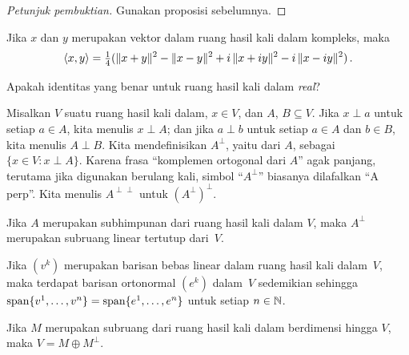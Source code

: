 \begin{proof}[\emph{Petunjuk pembuktian}] Gunakan proposisi sebelumnya. \ns
\end{proof}

\begin{prop}\label{0001507} Jika $x$ dan $y$ merupakan vektor
dalam ruang hasil kali dalam kompleks, maka
 \[ \langle x,y \rangle = \tfrac14 (\lVert x + y\rVert^2 - \lVert x - y\rVert^2
                       + i\,\lVert x + iy\rVert^2 - i\,\lVert x - iy\rVert^2)\,. \]
\end{prop}

Apakah identitas yang benar untuk ruang hasil kali dalam \emph{real}?

\begin{notn}\label{0001511} Misalkan $V$ suatu ruang hasil kali dalam, $x \in V$, dan $A$,
$B \subseteq V$. Jika $x \perp a$ untuk setiap $a \in A$, kita menulis $x \perp A$; dan jika $a
\perp b$ untuk setiap $a \in A$ dan $b \in B$, kita menulis $A \perp B$.
Kita mendefinisikan $A^\perp$, yaitu
 dari $A$, sebagai $\{x \in V\colon x \perp A\}$. Karena frasa ``komplemen ortogonal dari $A$''
agak panjang, terutama jika digunakan berulang kali, simbol ``$A^\perp$'' biasanya dilafalkan ``A perp''.
Kita menulis $A^{\perp\perp}$ untuk $\left(A^\perp\right)^\perp$.
\end{notn}

\begin{prop}\label{0001512} Jika $A$ merupakan subhimpunan dari ruang hasil kali dalam $V$, maka
$A^\perp$ merupakan subruang linear tertutup dari~$V$.
\end{prop}

\begin{prop} Jika $(v^k)$ merupakan barisan bebas linear dalam
ruang hasil kali dalam~$V$, maka terdapat barisan ortonormal $(e^k)$ dalam~$V$ sedemikian sehingga
$\operatorname{span}\{v^1, \dots, v^n\} = \operatorname{span}\{e^1, \dots, e^n\}$ untuk setiap $n \in \mathbb{N}$.
\end{prop}

\begin{cor}\label{0001514} Jika $M$ merupakan subruang dari ruang hasil kali dalam berdimensi
hingga $V$, maka $V = M \oplus M^\perp$.
\end{cor}

